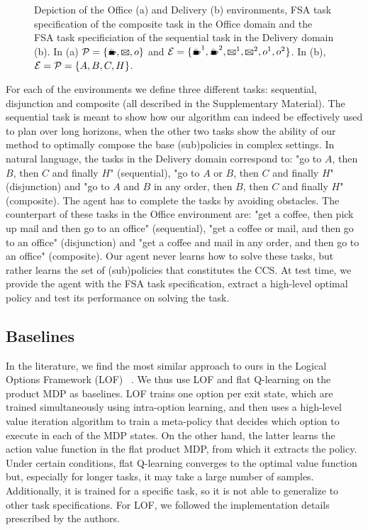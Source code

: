 \begin{figure}[!tb]
    \centering
    
  \caption{Depiction of the Office (a) and Delivery (b) environments, FSA task specification of the composite task in the Office domain and the FSA task specificiation of the sequential task in the Delivery domain (b). In (a) $\cP=\{\text{\coffee}, \text{\mail}, o\}$ and $\cE=\{\text{\coffee}^1,\text{\coffee}^2, \text{\mail}^1,\text{\mail}^2, o^1, o^2\}$. In (b), $\mathcal{E}=\mathcal{P}=\{A, B, C, H\}$.}
 \label{fig:delivery}
\end{figure}

For each of the environments we define three different tasks: sequential, disjunction and composite (all described in the Supplementary Material). The sequential task is meant to show how our algorithm can indeed be effectively used to plan over long horizons, when the other two tasks show the ability of our method to optimally compose the base (sub)policies in complex settings. In natural language, the tasks in the Delivery domain correspond to: "go to $A$, then $B$, then $C$ and finally $H$"  (sequential), "go to $A$ or $B$, then $C$ and finally $H$" (disjunction) and "go to $A$ and $B$ in any order, then $B$, then $C$ and finally $H$" (composite). The agent has to complete the tasks by avoiding obstacles. The counterpart of these tasks in the Office environment are: "get a coffee, then pick up mail and then go to an office" (sequential), "get a coffee or mail, and then go to an office" (disjunction) and "get a coffee and mail in any order, and then go to an office" (composite). 
Our agent never learns how to solve these tasks, but rather learns the set of (sub)policies that constitutes the CCS. At test time, we provide the agent with the FSA task specification, extract a high-level optimal policy and test its performance on solving the task.

\subsection{Baselines} In the literature, we find the most similar approach to ours in the Logical Options Framework (LOF) ~\citep{Araki2021}. We thus use LOF and flat Q-learning on the product MDP as baselines. LOF trains one option per exit state, which are trained simultaneously using intra-option learning, and then uses a high-level value iteration algorithm to train a meta-policy that decides which option to execute in each of the MDP states. On the other hand, the latter learns the action value function in the flat product MDP, from which it extracts the policy. Under certain conditions, flat Q-learning converges to the optimal value function but, especially for longer tasks, it may take a large number of samples. Additionally, it is trained for a specific task, so it is not able to generalize to other task specifications. For LOF, we followed the implementation details prescribed by the authors. 

